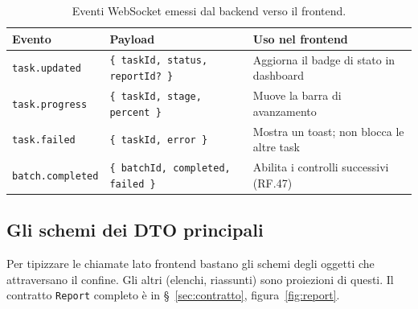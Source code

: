 \documentclass[11pt,a4paper]{article}
\begin{document}
\begin{table}[H]
\centering
\caption{Eventi WebSocket emessi dal backend verso il frontend.}
\label{tab:ws}
\vspace{2mm}
\renewcommand{\arraystretch}{1.2}
\begin{tabularx}{\textwidth}{|l|X|X|}
\hline
\textbf{Evento} & \textbf{Payload} & \textbf{Uso nel frontend} \\ \hline
\texttt{task.updated} & \texttt{\{ taskId, status, reportId? \}} & Aggiorna il badge di stato in dashboard \\ \hline
\texttt{task.progress} & \texttt{\{ taskId, stage, percent \}} & Muove la barra di avanzamento \\ \hline
\texttt{task.failed} & \texttt{\{ taskId, error \}} & Mostra un toast; non blocca le altre task \\ \hline
\texttt{batch.completed} & \texttt{\{ batchId, completed, failed \}} & Abilita i controlli successivi (RF.47) \\ \hline
\end{tabularx}
\end{table}

\subsection{Gli schemi dei DTO principali}

Per tipizzare le chiamate lato frontend bastano gli schemi degli oggetti che attraversano il confine. Gli altri (elenchi, riassunti) sono proiezioni di questi. Il contratto \texttt{Report} completo è in \S~\ref{sec:contratto}, figura~\ref{fig:report}.
\end{document}

